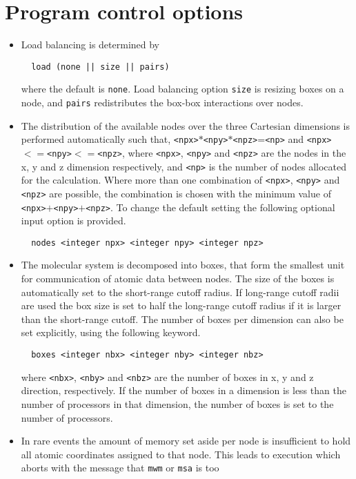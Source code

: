 \section{Program control options}
\begin{itemize}
\item
Load balancing is determined by
\begin{verbatim}
  load (none || size || pairs)
\end{verbatim}
where the default is {\tt none}. Load balancing option {\tt size}
is resizing boxes on a node, and {\tt pairs} redistributes the
box-box interactions over nodes.
\item
The distribution of the available nodes over the three Cartesian
dimensions is performed automatically such that, 
\verb+<npx>+$*$\verb+<npy>+$*$\verb+<npz>+=\verb+<np>+
and \verb+<npx>+$<=$\verb+<npy>+$<=$\verb+<npz>+, 
where \verb+<npx>+, \verb+<npy>+ and \verb+<npz>+ are the nodes in the
x, y and z dimension respectively, and \verb+<np>+ is the number of nodes
allocated for the calculation. Where more than one combination
of \verb+<npx>+, \verb+<npy>+ and \verb+<npz>+ are possible, the 
combination is chosen with the minimum value of 
\verb+<npx>+$+$\verb+<npy>+$+$\verb+<npz>+. To change the default setting
the following optional input option is provided.
\begin{verbatim}
  nodes <integer npx> <integer npy> <integer npz>
\end{verbatim}
\item
The molecular system is decomposed into boxes, that form the smallest
unit for communication of atomic data between nodes. The size of the
boxes is automatically set to the short-range cutoff radius. If
long-range cutoff radii  are used the box size is set to half the
long-range cutoff radius if it is larger than the short-range cutoff.
The number of boxes per dimension can also be set explicitly, using
the following keyword.
\begin{verbatim}
  boxes <integer nbx> <integer nby> <integer nbz>
\end{verbatim}
where \verb+<nbx>+, \verb+<nby>+ and \verb+<nbz>+ are the number of
boxes in x, y and z direction, respectively.
If the number of boxes in a dimension is less than the number of
processors in that dimension, the number of boxes is set to the number
of processors.
\item
In rare events the amount of memory set aside per node is insufficient
to hold all atomic coordinates assigned to that node. This leads to 
execution which aborts with the message that {\tt mwm} or {\tt msa} is too

\end{itemize}
